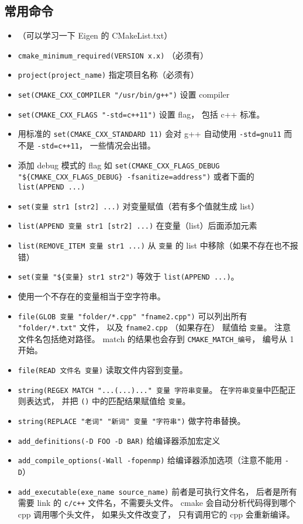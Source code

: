 \subsection{常用命令}
\begin{itemize}
\item （可以学习一下 Eigen 的 CMakeList.txt）
\item \verb`cmake_minimum_required(VERSION x.x)` （必须有）
\item \verb`project(project_name)` 指定项目名称（必须有）
\item \verb|set(CMAKE_CXX_COMPILER "/usr/bin/g++")| 设置 compiler
\item \verb|set(CMAKE_CXX_FLAGS "-std=c++11")| 设置 flag， 包括 c++ 标准。
\item 用标准的 \verb|set(CMAKE_CXX_STANDARD 11)| 会对 g++ 自动使用 \verb|-std=gnu11| 而不是 \verb|-std=c++11|， 一些情况会出错。
\item 添加 debug 模式的 flag 如 \verb|set(CMAKE_CXX_FLAGS_DEBUG "${CMAKE_CXX_FLAGS_DEBUG} -fsanitize=address")| 或者下面的 \verb`list(APPEND ...)`
\item \verb`set(变量 str1 [str2] ...)` 对变量赋值（若有多个值就生成 list）
\item \verb`list(APPEND 变量 str1 [str2] ...)` 在变量（list）后面添加元素
\item \verb|list(REMOVE_ITEM 变量 str1 ...)| 从 \verb|变量| 的 list 中移除（如果不存在也不报错）
\item \verb|set(变量 "${变量} str1 str2")| 等效于 \verb`list(APPEND ...)`。
\item 使用一个不存在的变量相当于空字符串。
\item \verb`file(GLOB 变量 "folder/*.cpp" "fname2.cpp")` 可以列出所有 \verb|"folder/*.txt"| 文件， 以及 \verb|fname2.cpp| （如果存在） 赋值给 \verb|变量|。 注意文件名包括绝对路径。 match 的结果也会存到 \verb|CMAKE_MATCH_编号|， 编号从 1 开始。
\item \verb|file(READ 文件名 变量)| 读取文件内容到变量。
\item \verb|string(REGEX MATCH "...(...)..." 变量 字符串变量|。 在\verb|字符串变量|中匹配正则表达式， 并把 \verb|()| 中的匹配结果赋值给 \verb|变量|。
\item \verb|string(REPLACE "老词" "新词" 变量 "字符串")| 做字符串替换。
\item \verb|add_definitions(-D FOO -D BAR)| 给编译器添加宏定义
\item \verb|add_compile_options(-Wall -fopenmp)| 给编译器添加选项（注意不能用 \verb|-D|）
\item \verb`add_executable(exe_name source_name)` 前者是可执行文件名， 后者是所有需要 link 的 \verb|c/c++| 文件名，不需要头文件。 cmake 会自动分析代码得到哪个 cpp 调用哪个头文件， 如果头文件改变了， 只有调用它的 cpp 会重新编译。

\end{itemize}
